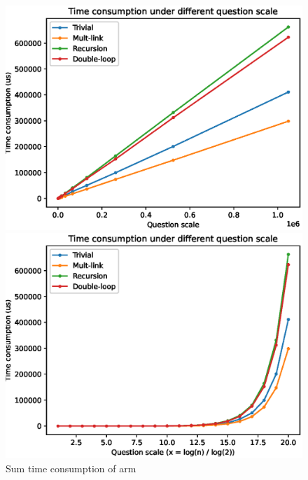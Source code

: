 \documentclass[12pt, a4paper, oneside]{ctexart}
\begin{document}
\begin{figure}[htbp]
    \centering
    \begin{minipage}{0.45\linewidth}
        \centering
        \includegraphics[scale = 0.5]{./picture/sum_arm_1.eps}
        \caption{$x = n$}
    \end{minipage}
    \centering
    \begin{minipage}{0.45\linewidth}
        \centering
        \includegraphics[scale = 0.5]{./picture/sum_arm_2.eps}
        \caption{$x = \log_2(n)$}
    \end{minipage}
    \caption{Sum time consumption of arm}
    \label{sum_arm}
\end{figure}
\end{document}
